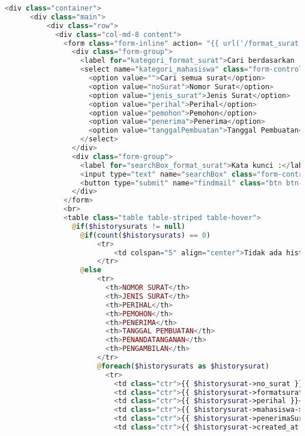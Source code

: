 \begin{lstlisting}[language=php,basicstyle=\tiny,caption=\textit{History} pejabat]
    <div class="container">
      <div class="main">
          <div class="row">
            <div class="col-md-8 content">
              <form class="form-inline" action= "{{ url('/format_surat') }}" method="get">
                <div class="form-group">
                  <label for="kategori_format_surat">Cari berdasarkan :</label><br>
                  <select name="kategori_mahasiswa" class="form-control">
                    <option value="">Cari semua surat</option>
                    <option value="noSurat">Nomor Surat</option>
                    <option value="jenis_surat">Jenis Surat</option>
                    <option value="perihal">Perihal</option>
                    <option value="pemohon">Pemohon</option>
                    <option value="penerima">Penerima</option>
                    <option value="tanggalPembuatan">Tanggal Pembuatan</option>
                  </select>
                </div>
                <div class="form-group">
                  <label for="searchBox_format_surat">Kata kunci :</label><br>
                  <input type="text" name="searchBox" class="form-control" size="68" />
                  <button type="submit" name="findmail" class="btn btn-primary">Cari surat</button>
                </div>
              </form>
              <br>
              <table class="table table-striped table-hover">
                @if($historysurats != null)
                  @if(count($historysurats) == 0)
                      <tr>
                          <td colspan="5" align="center">Tidak ada history surat....</td>
                      </tr>
                  @else
                      <tr>
                        <th>NOMOR SURAT</th>
                        <th>JENIS SURAT</th>
                        <th>PERIHAL</th>
                        <th>PEMOHON</th>
                        <th>PENERIMA</th>
                        <th>TANGGAL PEMBUATAN</th>
                        <th>PENANDATANGANAN</th>
                        <th>PENGAMBILAN</th>
                      </tr>
                      @foreach($historysurats as $historysurat)
                        <tr>
                          <td class="ctr">{{ $historysurat->no_surat }}</td>
                          <td class="ctr">{{ $historysurat->formatsurat->jenis_surat }}</td>
                          <td class="ctr">{{ $historysurat->perihal }}</td>
                          <td class="ctr">{{ $historysurat->mahasiswa->nama_mahasiswa  }}</td>
                          <td class="ctr">{{ $historysurat->penerimaSurat }}</td>
                          <td class="ctr">{{ $historysurat->created_at }}</td>

\end{lstlisting}
